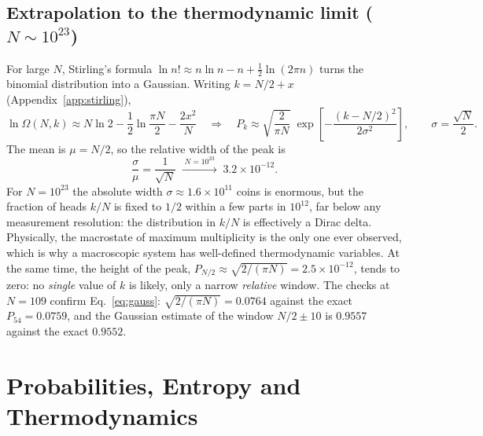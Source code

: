 \documentclass[11pt,a4paper]{article}
\begin{document}
\subsection{Extrapolation to the thermodynamic limit \texorpdfstring{($N\sim10^{23}$)}{(N ~ 1e23)}}
\label{sec:limit}
For large $N$, Stirling's formula $\ln n!\approx n\ln n-n+\tfrac12\ln(2\pi n)$ turns the
binomial distribution into a Gaussian. Writing $k=N/2+x$ (Appendix~\ref{app:stirling}),
\begin{equation}
  \ln\Omega(N,k)\approx N\ln2-\frac12\ln\frac{\pi N}{2}-\frac{2x^2}{N}
  \quad\Longrightarrow\quad
  P_k\approx\sqrt{\frac{2}{\pi N}}\;\exp\!\left[-\frac{(k-N/2)^2}{2\sigma^2}\right],
  \qquad \sigma=\frac{\sqrt N}{2}.
  \label{eq:gauss}
\end{equation}
The mean is $\mu=N/2$, so the relative width of the peak is
\begin{equation}
  \frac{\sigma}{\mu}=\frac{1}{\sqrt N}\;\xrightarrow{\;N=10^{23}\;}\;3.2\times10^{-12}.
  \label{eq:width}
\end{equation}
For $N=10^{23}$ the absolute width $\sigma\approx1.6\times10^{11}$ coins is enormous, but the
fraction of heads $k/N$ is fixed to $1/2$ within a few parts in $10^{12}$, far below any
measurement resolution: the distribution in $k/N$ is effectively a Dirac delta. Physically, the
macrostate of maximum multiplicity is the only one ever observed, which is why a macroscopic
system has well-defined thermodynamic variables. At the same time, the height of the peak,
$P_{N/2}\approx\sqrt{2/(\pi N)}=2.5\times10^{-12}$, tends to zero: no \emph{single} value of $k$
is likely, only a narrow \emph{relative} window. The checks at $N=109$ confirm Eq.~\eqref{eq:gauss}:
$\sqrt{2/(\pi N)}=0.0764$ against the exact $P_{54}=0.0759$, and the Gaussian estimate of the
window $N/2\pm10$ is $0.9557$ against the exact $0.9552$.

\section{Probabilities, Entropy and Thermodynamics}
\label{sec:part2}
\end{document}
